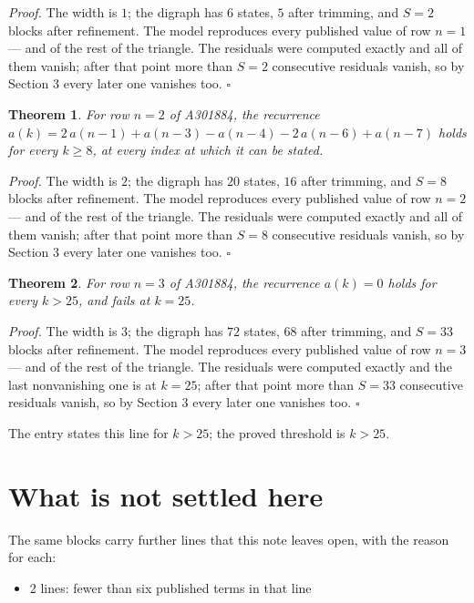 \documentclass[11pt]{article}
\newtheorem{theorem}{Theorem}
\theoremstyle{definition}
\begin{document}
{\itshape Proof.} The width is $1$; the digraph has $6$ states, $5$ after trimming, and $S = 2$ blocks after refinement. The model reproduces every published value of row $n = 1$ --- and of the rest of the triangle. The residuals were computed exactly and all of them vanish; after that point more than $S = 2$ consecutive residuals vanish, so by Section 3 every later one vanishes too. $\square$

\begin{theorem} For row $n = 2$ of A301884, the recurrence $a(k) = 2\,a(n-1) + a(n-3) - a(n-4) - 2\,a(n-6) + a(n-7)$ holds for every $k \ge 8$, at every index at which it can be stated.\end{theorem}

{\itshape Proof.} The width is $2$; the digraph has $20$ states, $16$ after trimming, and $S = 8$ blocks after refinement. The model reproduces every published value of row $n = 2$ --- and of the rest of the triangle. The residuals were computed exactly and all of them vanish; after that point more than $S = 8$ consecutive residuals vanish, so by Section 3 every later one vanishes too. $\square$

\begin{theorem} For row $n = 3$ of A301884, the recurrence $a(k) = 0$ holds for every $k > 25$, and fails at $k = 25$.\end{theorem}

{\itshape Proof.} The width is $3$; the digraph has $72$ states, $68$ after trimming, and $S = 33$ blocks after refinement. The model reproduces every published value of row $n = 3$ --- and of the rest of the triangle. The residuals were computed exactly and the last nonvanishing one is at $k = 25$; after that point more than $S = 33$ consecutive residuals vanish, so by Section 3 every later one vanishes too. $\square$

The entry states this line for $k > 25$; the proved threshold is $k > 25$.

\section{What is not settled here}

The same blocks carry further lines that this note leaves open, with the reason for each:

\begin{itemize}

\item 2 lines: fewer than six published terms in that line

\end{itemize}
\end{document}
